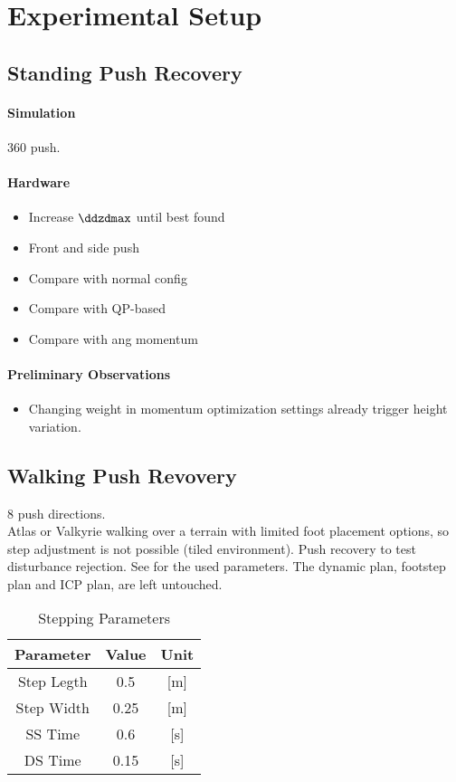 %
\chapter{Experimental Setup}

\section{Standing Push Recovery}
\subsubsection{Simulation}
360 push.
\subsubsection{Hardware}
\begin{itemize}
	\item Increase $\ddzdmax$ until best found
	\item Front and side push
	\item Compare with normal config
	\item Compare with QP-based
	\item Compare with ang momentum
\end{itemize}
\subsubsection{Preliminary Observations}
\begin{itemize}
	\item Changing weight in momentum optimization settings already trigger height variation.
\end{itemize}

\section{Walking Push Revovery}
8 push directions.\\
Atlas or Valkyrie walking over a terrain with limited foot placement options, so step adjustment is not possible (tiled environment). Push recovery to test disturbance rejection. See  for the used parameters. The dynamic plan, footstep plan and \ac{ICP} plan, are left untouched.
\begin{table}[ht]
\caption{Stepping Parameters} %
\centering %
\begin{tabular}{c c c } %
\hline\hline %
Parameter & Value & Unit \\
\hline %
Step Legth & 0.5 &  [m]\\
Step Width & 0.25 & [m]\\
\acs{SS} Time & 0.6 & [s]\\
\acs{DS} Time & 0.15 & [s]\\
\hline %
\end{tabular}
\label{tab:stepping} %
\end{table}
